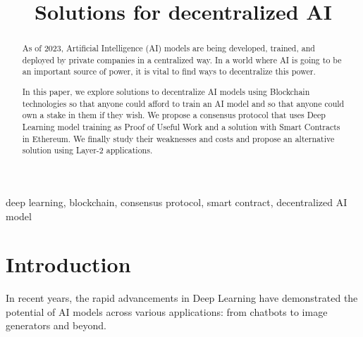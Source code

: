 \documentclass[conference]{IEEEtran}
\begin{document}
\title{Solutions for decentralized AI\\
}

\author{
\and
{}
\and
{}
}
\maketitle

\begin{abstract}
As of 2023, Artificial Intelligence (AI) models are being developed, trained, and deployed by private companies in a centralized way. In a world where AI is going to be an important source of power, it is vital to find ways to decentralize this power.

In this paper, we explore solutions to decentralize AI models using Blockchain technologies so that anyone could afford to train an AI model and so that anyone could own a stake in them if they wish. We propose a consensus protocol that uses Deep Learning model training as Proof of Useful Work and a solution with Smart Contracts in Ethereum. We finally study their weaknesses and costs and propose an alternative solution using Layer-2 applications.
\end{abstract}

\begin{IEEEkeywords}
deep learning, blockchain, consensus protocol, smart contract, decentralized AI model
\end{IEEEkeywords}

\section{Introduction}
In recent years, the rapid advancements in Deep Learning have demonstrated the potential of AI models across various applications: from chatbots to image generators and beyond.
\end{document}
